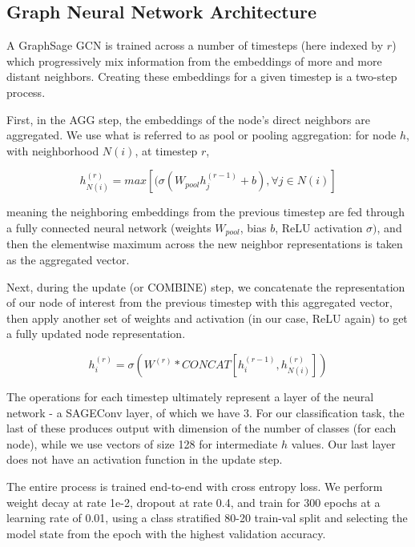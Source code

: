 \documentclass{article}[11pt]
\begin{document}
    \clearpage
    \newpage

    \subsection{Graph Neural Network Architecture}

    \label{sec:gnn-architecture}


    A GraphSage GCN is trained across a number of timesteps (here indexed by $r$) which progressively mix information from the embeddings of more and more distant neighbors. Creating these embeddings for a given timestep is a two-step process.

    First, in the AGG step, the embeddings of the node's direct neighbors are aggregated. We use what is referred to as pool or pooling aggregation: for node $h$, with neighborhood $N(i)$, at timestep $r$,

    \[
    h_{N(i)}^{(r)}=max[(\sigma(W_{pool}h_{j}^{(r-1)}+b),\forall j\in N(i)]
    \]

    meaning the neighboring embeddings from the previous timestep are fed through a fully connected neural network (weights $W_{pool}$, bias $b$, ReLU activation $\sigma)$, and then the elementwise maximum across the new neighbor representations is taken as the aggregated vector.

    Next, during the update (or COMBINE) step, we concatenate the representation of our node of interest from the previous timestep with this aggregated vector, then apply another set of weights and activation (in our case, ReLU again) to get a fully updated node representation.

    \[
    h_{i}^{(r)}=\sigma(W^{(r)}*CONCAT[h_{i}^{(r-1)},h_{N(i)}^{(r)}])
    \]

    The operations for each timestep ultimately represent a layer of the neural network - a SAGEConv layer, of which we have 3. For our classification task, the last of these produces output with dimension of the number of classes (for each node), while we use vectors of size 128 for intermediate $h$ values. Our last layer does not have an activation function in the update step. 
    
    The entire process is trained end-to-end with cross entropy loss. We perform weight decay at rate 1e-2, dropout at rate 0.4, and train for 300 epochs at a learning rate of 0.01, using a class stratified 80-20 train-val split and selecting the model state from the epoch with the highest validation accuracy.

\end{document}
